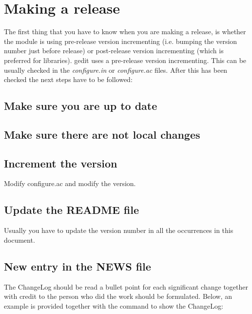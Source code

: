 \chapter{Making a release}\label{chap:Release}

The first thing that you have to know when you are making a release, is whether the module is using pre-release version incrementing (i.e. bumping the version number just before release) or post-release version incrementing (which is preferred for libraries). gedit uses a pre-release version incrementing. This can be usually checked in the \emph{configure.in} or \emph{configure.ac} files. After this has been checked the next steps have to be followed:

\section*{Make sure you are up to date}

\noindent{}

\section*{Make sure there are not local changes}

\noindent{}

\section*{Increment the version}

\noindent Modify configure.ac and modify the version.

\section*{Update the README file}

\noindent Usually you have to update the version number in all the occurrences in this document.

\section*{New entry in the NEWS file}

\noindent The ChangeLog should be read a bullet point for each significant change together with credit to the person 
who did the work should be formulated. Below, an example is provided together with the command to show the ChangeLog:

